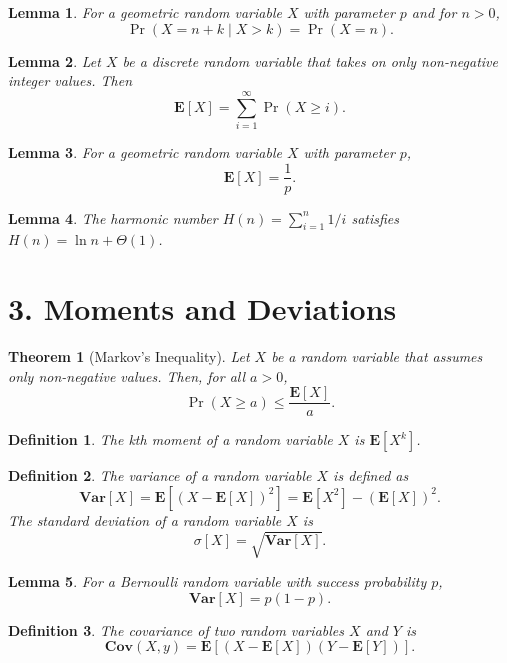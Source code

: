 \documentclass{amsart}
\newtheorem*{definition}{Definition}
\newtheorem*{theorem}{Theorem}
\newtheorem*{lemma}{Lemma}
\newcommand{\E}{\mathbf{E}}
\newcommand{\Var}{\mathbf{Var}}
\newcommand{\Cov}{\mathbf{Cov}}
\begin{document}
\begin{lemma}
  For a geometric random variable $X$ with parameter $p$ and for $n > 0$,
  \[
    \Pr(X = n + k \mid X > k) = \Pr(X = n).
  \]
\end{lemma}

\begin{lemma}
  Let $X$ be a discrete random variable that takes on only non-negative integer
  values. Then
  \[
    \E[X] = \sum_{i = 1}^{\infty} \Pr(X \geq i).
  \]
\end{lemma}

\begin{lemma}
  For a geometric random variable $X$ with parameter $p$,
  \[
    \E[X] = \frac{1}{p}.
  \]
\end{lemma}

\begin{lemma}
  The harmonic number $H(n) = \sum_{i = 1}^n 1/i$ satisfies $H(n) = \ln n +
  \Theta(1)$.
\end{lemma}



\section*{3. Moments and Deviations}

\begin{theorem}[Markov's Inequality]
  Let $X$ be a random variable that assumes only non-negative values. Then, for
  all $a > 0$,
  \[
    \Pr(X \geq a) \leq \frac{\E[X]}{a}.
  \]
\end{theorem}

\begin{definition}
  The kth moment of a random variable $X$ is $\E[X^k]$.
\end{definition}

\begin{definition}
  The \emph{variance} of a random variable $X$ is defined as
  \[
    \Var[X] = \E[{(X - \E[X])}^2] = \E[X^2] - {(\E[X])}^2.
  \]
  The \emph{standard deviation} of a random variable $X$ is
  \[
    \sigma[X] = \sqrt{\Var[X]}.
  \]
\end{definition}

\begin{lemma}
  For a Bernoulli random variable with success probability $p$,
  \[
    \Var[X] = p(1 - p).
  \]
\end{lemma}

\begin{definition}
  The \emph{covariance} of two random variables $X$ and $Y$ is
  \[
    \Cov(X, y) = \E[(X - \E[X]) (Y - \E[Y])].
  \]
\end{definition}
\end{document}
